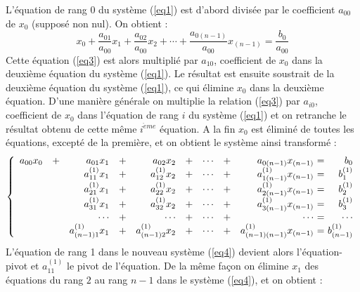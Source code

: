L'équation de rang 0 du système (\ref{eq1}) est d'abord divisée par le coefficient 
$a_{00}$ de $x_0$ (supposé non nul). On obtient :
\begin{equation}\label{eq3}
x_0 + \frac{a_{01}}{a_{00}}x_1 + \frac{a_{02}}{a_{00}}x_2 + \cdots + \frac{a_{0(n-1)}}{a_{00}}x_{(n-1)} = \frac{b_0}{a_{00}}
\end{equation}
Cette équation (\ref{eq3}) est alors multiplié par $a_{10}$, coefficient de $x_0$ dans 
la deuxième équation du système (\ref{eq1}). Le résultat est ensuite soustrait de la 
deuxième équation du système (\ref{eq1}), ce qui élimine $x_0$ dans la deuxième équation.
D'une manière générale on multiplie la relation (\ref{eq3}) par $a_{i0}$, coefficient
de $x_0$ dans l'équation de rang $i$ du système (\ref{eq1}) et on retranche le résultat
obtenu de cette même $i^{\grave eme}$ équation. A la fin $x_0$ est éliminé de toutes les équations, excepté de la première, et on obtient le système ainsi transformé :
\begin{equation}\label{eq4}
\left\{
\begin{array}{rcrcrcrcr@{\ =\ }r}
a_{00}x_0 &+& a_{01}x_1       &+& a_{02}x_2       &+& \cdots &+& a_{0(n-1)}x_{(n-1)}       & b_0\\
          & & a^{(1)}_{11}x_1 &+& a^{(1)}_{12}x_2 &+& \cdots &+& a^{(1)}_{1(n-1)}x_{(n-1)} & b^{(1)}_1\\
          & & a^{(1)}_{21}x_1 &+& a^{(1)}_{22}x_2 &+& \cdots &+& a^{(1)}_{2(n-1)}x_{(n-1)} & b^{(1)}_2\\
          & & a^{(1)}_{31}x_1 &+& a^{(1)}_{32}x_2 &+& \cdots &+& a^{(1)}_{3(n-1)}x_{(n-1)} & b^{(1)}_3\\
          & & \cdots          &+& \cdots          &+& \cdots &+& \cdots                    & \cdots\\
          & & a^{(1)}_{(n-1)1}x_1 &+& a^{(1)}_{(n-1)2}x_2 &+& \cdots &+& a^{(1)}_{(n-1)(n-1)}x_{(n-1)}   & b^{(1)}_{(n-1)}
\end{array}
\right.
\end{equation}
L'équation de rang 1 dans le nouveau système (\ref{eq4}) devient alors l'équation-pivot
et $a^{(1)}_{11}$ le pivot de l'équation. De la même façon on élimine $x_1$ des
équations du rang $2$ au rang $n-1$ dans le système (\ref{eq4}), et on obtient :
